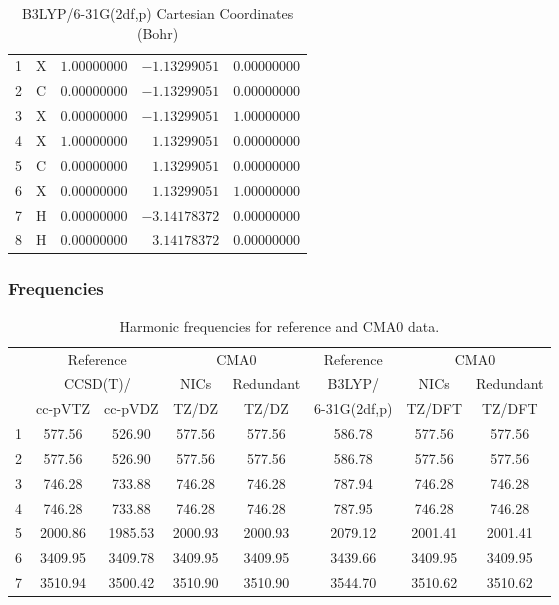 \documentclass[10pt,oneside]{article}
\begin{document}
\begin{table}[h]
\centering
\caption{B3LYP/6-31G(2df,p) Cartesian Coordinates (Bohr)}
\begin{tabular}{llrrr}
\toprule
1  & X  & $ 1.00000000$ & $-1.13299051$ & $ 0.00000000$ \\
2  & C  & $ 0.00000000$ & $-1.13299051$ & $ 0.00000000$ \\
3  & X  & $ 0.00000000$ & $-1.13299051$ & $ 1.00000000$ \\
4  & X  & $ 1.00000000$ & $ 1.13299051$ & $ 0.00000000$ \\
5  & C  & $ 0.00000000$ & $ 1.13299051$ & $ 0.00000000$ \\
6  & X  & $ 0.00000000$ & $ 1.13299051$ & $ 1.00000000$ \\
7  & H  & $ 0.00000000$ & $-3.14178372$ & $ 0.00000000$ \\
8  & H  & $ 0.00000000$ & $ 3.14178372$ & $ 0.00000000$ \\
\bottomrule
\end{tabular}
\end{table}

\begin{table}[h!]
\subsubsection*{Frequencies}
\centering
\caption{Harmonic frequencies for reference and CMA0 data.}
\begin{tabular}{cccccccc}
\toprule
{} & \multicolumn{2}{c}{Reference} & \multicolumn{2}{c}{CMA0} &    Reference & \multicolumn{2}{c}{CMA0} \\
{} & \multicolumn{2}{c}{CCSD(T)/} &    NICs &  Redundant &       B3LYP/ &    NICs & Redundant \\
{} &   cc-pVTZ & cc-pVDZ &   TZ/DZ &      TZ/DZ & 6-31G(2df,p) &  TZ/DFT &    TZ/DFT \\
\midrule
1 &    577.56 &  526.90 &  577.56 &     577.56 &       586.78 &  577.56 &    577.56 \\
2 &    577.56 &  526.90 &  577.56 &     577.56 &       586.78 &  577.56 &    577.56 \\
3 &    746.28 &  733.88 &  746.28 &     746.28 &       787.94 &  746.28 &    746.28 \\
4 &    746.28 &  733.88 &  746.28 &     746.28 &       787.95 &  746.28 &    746.28 \\
5 &   2000.86 & 1985.53 & 2000.93 &    2000.93 &      2079.12 & 2001.41 &   2001.41 \\
6 &   3409.95 & 3409.78 & 3409.95 &    3409.95 &      3439.66 & 3409.95 &   3409.95 \\
7 &   3510.94 & 3500.42 & 3510.90 &    3510.90 &      3544.70 & 3510.62 &   3510.62 \\
\bottomrule
\end{tabular}
\end{table}
\end{document}

